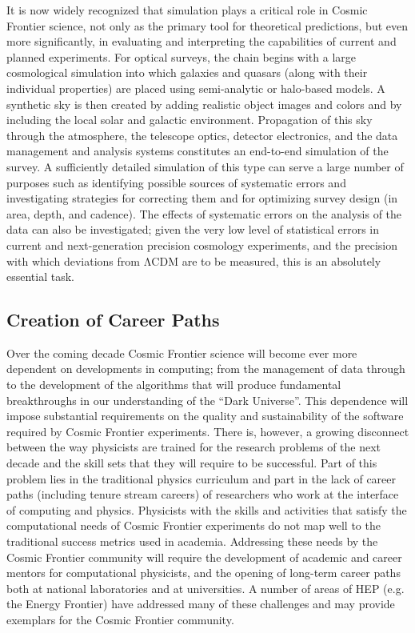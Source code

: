 It is now widely recognized that simulation plays a critical role in
Cosmic Frontier science, not only as the primary tool for theoretical
predictions, but even more significantly, in evaluating and
interpreting the capabilities of current and planned experiments. For
optical surveys, the chain begins with a large cosmological simulation
into which galaxies and quasars (along with their individual
properties) are placed using semi-analytic or halo-based models. A
synthetic sky is then created by adding realistic object images and
colors and by including the local solar and galactic
environment. Propagation of this sky through the atmosphere, the
telescope optics, detector electronics, and the data management and
analysis systems constitutes an end-to-end simulation of the survey. A
sufficiently detailed simulation of this type can serve a large number
of purposes such as identifying possible sources of systematic errors
and investigating strategies for correcting them and for optimizing
survey design (in area, depth, and cadence). The effects of systematic
errors on the analysis of the data can also be investigated; given the
very low level of statistical errors in current and next-generation
precision cosmology experiments, and the precision with which
deviations from ΛCDM are to be measured, this is an absolutely
essential task.

\subsection{Creation of Career Paths} 

Over the coming decade Cosmic Frontier science will become ever more
dependent on developments in computing; from the management of data
through to the development of the algorithms that will produce
fundamental breakthroughs in our understanding of the ``Dark
Universe''. This dependence will impose substantial requirements on
the quality and sustainability of the software required by Cosmic
Frontier experiments. There is, however, a growing disconnect between
the way physicists are trained for the research problems of the next
decade and the skill sets that they will require to be
successful. Part of this problem lies in the traditional physics
curriculum and part in the lack of career paths (including tenure
stream careers) of researchers who work at the interface of computing
and physics. Physicists with the skills and activities that satisfy
the computational needs of Cosmic Frontier experiments do not map well
to the traditional success metrics used in academia. Addressing these
needs by the Cosmic Frontier community will require the development of
academic and career mentors for computational physicists, and the
opening of long-term career paths both at national laboratories and at
universities. A number of areas of HEP (e.g. the Energy Frontier) have
addressed many of these challenges and may provide exemplars for the
Cosmic Frontier community.


